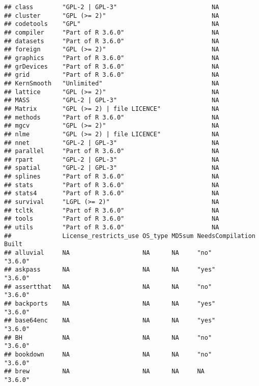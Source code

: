 \documentclass[]{book}
\begin{document}
\begin{verbatim}
## class        "GPL-2 | GPL-3"                          NA             
## cluster      "GPL (>= 2)"                             NA             
## codetools    "GPL"                                    NA             
## compiler     "Part of R 3.6.0"                        NA             
## datasets     "Part of R 3.6.0"                        NA             
## foreign      "GPL (>= 2)"                             NA             
## graphics     "Part of R 3.6.0"                        NA             
## grDevices    "Part of R 3.6.0"                        NA             
## grid         "Part of R 3.6.0"                        NA             
## KernSmooth   "Unlimited"                              NA             
## lattice      "GPL (>= 2)"                             NA             
## MASS         "GPL-2 | GPL-3"                          NA             
## Matrix       "GPL (>= 2) | file LICENCE"              NA             
## methods      "Part of R 3.6.0"                        NA             
## mgcv         "GPL (>= 2)"                             NA             
## nlme         "GPL (>= 2) | file LICENCE"              NA             
## nnet         "GPL-2 | GPL-3"                          NA             
## parallel     "Part of R 3.6.0"                        NA             
## rpart        "GPL-2 | GPL-3"                          NA             
## spatial      "GPL-2 | GPL-3"                          NA             
## splines      "Part of R 3.6.0"                        NA             
## stats        "Part of R 3.6.0"                        NA             
## stats4       "Part of R 3.6.0"                        NA             
## survival     "LGPL (>= 2)"                            NA             
## tcltk        "Part of R 3.6.0"                        NA             
## tools        "Part of R 3.6.0"                        NA             
## utils        "Part of R 3.6.0"                        NA             
##              License_restricts_use OS_type MD5sum NeedsCompilation Built  
## alluvial     NA                    NA      NA     "no"             "3.6.0"
## askpass      NA                    NA      NA     "yes"            "3.6.0"
## assertthat   NA                    NA      NA     "no"             "3.6.0"
## backports    NA                    NA      NA     "yes"            "3.6.0"
## base64enc    NA                    NA      NA     "yes"            "3.6.0"
## BH           NA                    NA      NA     "no"             "3.6.0"
## bookdown     NA                    NA      NA     "no"             "3.6.0"
## brew         NA                    NA      NA     NA               "3.6.0"

\end{verbatim}
\end{document}

